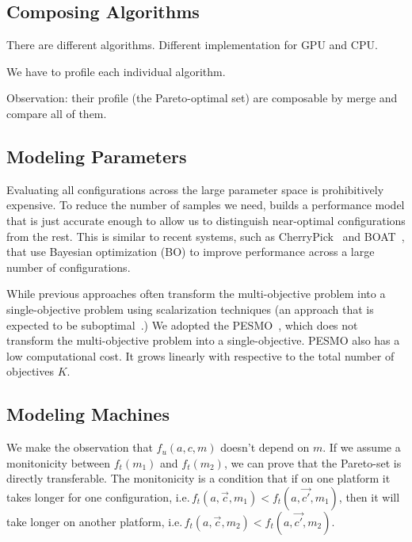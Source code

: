 \subsection{Composing Algorithms}
\label{sec:compose-models}

There are different algorithms. Different implementation for GPU and CPU.

We have to profile each individual algorithm.

Observation: their profile (the Pareto-optimal set) are composable by merge and
compare all of them.

\subsection{Modeling Parameters}
\label{sec:single-platform}

Evaluating all configurations across the large parameter space is prohibitively
expensive. To reduce the number of samples we need, \sysname{} builds a
performance model that is just accurate enough to allow us to distinguish
near-optimal configurations from the rest. This is similar to recent systems,
such as CherryPick~\cite{alipourfard2017cherrypick} and
BOAT~\cite{dalibard2017boat}, that use Bayesian optimization (BO) to improve
performance across a large number of configurations.

While previous approaches often transform the multi-objective problem into a
single-objective problem using scalarization techniques (an approach that is
expected to be suboptimal~\cite{knowles2006parego}.) We adopted the
PESMO~\cite{hernandez2016predictive}, which does not transform the
multi-objective problem into a single-objective. PESMO also has a low
computational cost. It grows linearly with respective to the total number of
objectives $K$.

\subsection{Modeling Machines}
\label{sec:performance-transfer}

We make the observation that $f_u(a, c, m)$ doesn't depend on $m$. If we assume
a monitonicity between $f_t(m_1)$ and $f_t(m_2)$, we can prove that the
Pareto-set is directly transferable. The monitonicity is a condition that if on
one platform it takes longer for one configuration,
i.e.\,$f_t(a, \vec{c}, m_1) < f_t(a, \vec{c'}, m_1)$, then it will take longer
on another platform, i.e.\,$f_t(a, \vec{c}, m_2) < f_t(a, \vec{c'}, m_2)$.

